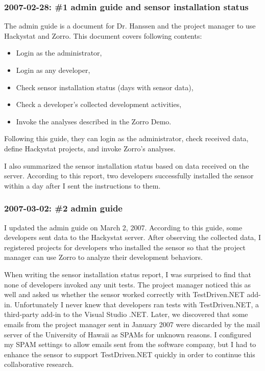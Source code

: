 \subsubsection{2007-02-28: \#1  admin guide and sensor installation status}
The admin guide is a document for Dr. Hanssen and the project manager to use Hackystat and Zorro. This document covers following contents:
\begin{itemize}
\item Login as the administrator, 
\item Login as any developer,
\item Check sensor installation status (days with sensor data),
\item Check a developer's collected development activities,
\item Invoke the analyses described in the Zorro Demo.
\end{itemize} 
Following this guide, they can login as the administrator, check received data, define Hackystat projects, and invoke Zorro's analyses. 

I also summarized the sensor installation status based on data received on the server. According to this report, two developers successfully installed the sensor within a day after I sent the instructions to them. 

\subsubsection{2007-03-02: \#2 admin guide }
I updated the admin guide on March 2, 2007. According to this guide, some developers sent data to the Hackystat server. After observing the collected data, I registered projects for developers who installed the sensor so that the project manager can use Zorro to analyze their  development behaviors. 

When writing the sensor installation status report, I was surprised to find that none of developers invoked any unit tests. The project manager noticed this as well and asked us whether the sensor worked correctly with TestDriven.NET add-in. Unfortunately I never knew that developers ran tests with TestDriven.NET, a third-party add-in to the Visual Studio .NET. Later, we discovered that some emails from the project manager sent in January 2007 were discarded by the mail server of the University of Hawaii as SPAMs for unknown reasons. I configured my SPAM settings to allow emails sent from the software company, but I had to enhance the sensor to support TestDriven.NET quickly in order to continue this collaborative research. 

